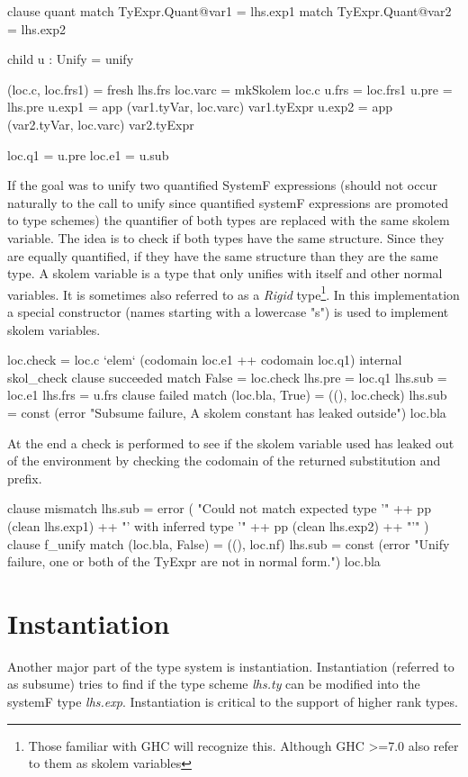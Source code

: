 \begin{code}
clause quant
  match TyExpr.Quant@var1 = lhs.exp1
  match TyExpr.Quant@var2 = lhs.exp2
  
  child u : Unify = unify
  
  (loc.c, loc.frs1) = fresh lhs.frs
  loc.varc = mkSkolem loc.c
  u.frs  = loc.frs1
  u.pre  = lhs.pre
  u.exp1 = app (var1.tyVar, loc.varc) var1.tyExpr
  u.exp2 = app (var2.tyVar, loc.varc) var2.tyExpr
  
  loc.q1 = u.pre
  loc.e1 = u.sub
\end{code}
If the goal was to unify two quantified SystemF expressions (should not occur naturally to the call to unify since quantified systemF expressions are promoted to type schemes) the quantifier of both types are replaced with the same skolem variable. The idea is to check if both types have the same structure. Since they are equally quantified, if they have the same structure than they are the same type.
A skolem variable is a type that only unifies with itself and other normal variables. It is sometimes also referred to as a \emph{Rigid} type\footnote{Those familiar with GHC will recognize this. Although GHC >=7.0 also refer to them as skolem variables}. In this implementation a special constructor (names starting with a lowercase "s") is used to implement skolem variables.
\begin{code}                       
loc.check = loc.c `elem` (codomain loc.e1 ++ codomain loc.q1)
internal skol_check
   clause succeeded
     match False  = loc.check
     lhs.pre = loc.q1
     lhs.sub = loc.e1
     lhs.frs = u.frs
   clause failed
     match (loc.bla, True) = ((), loc.check)
     lhs.sub = const (error "Subsume failure, A skolem constant has leaked outside") loc.bla
\end{code}
At the end a check is performed to see if the skolem variable used has leaked out of the environment by checking the codomain of the returned substitution and prefix.

\begin{code}
    clause mismatch
      lhs.sub = error (  "Could not match expected type '" 
                       ++ pp (clean lhs.exp1) ++ "' with inferred type '" 
                       ++ pp (clean lhs.exp2) ++ "'" )
clause f_unify
  match (loc.bla, False) = ((), loc.nf)
  lhs.sub = const (error "Unify failure, one or both of the TyExpr are not in normal form.") loc.bla
\end{code}

\section{Instantiation}
Another major part of the type system is instantiation. Instantiation (referred to as subsume) tries to find if the type scheme \emph{lhs.ty} can be modified into the systemF type \emph{lhs.exp}. Instantiation is critical to the support of higher rank types.

